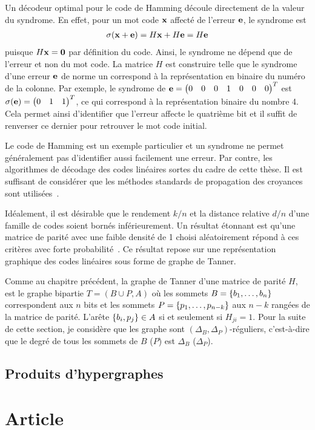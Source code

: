 Un décodeur optimal pour le code de Hamming découle directement de la valeur du syndrome.
En effet, pour un mot code $\vb x$ affecté de l'erreur $\vb e$,
le syndrome est 
\begin{align}
	\sigma(\vb x + \vb e) = H\vb x + H\vb e = H\vb e
\end{align}
puisque $H \vb x = \vb 0$ par définition du code.
Ainsi, le syndrome ne dépend que de l'erreur et non du mot code.
La matrice $H$ est construire telle que le syndrome d'une erreur $\vb e$ de norme un
correspond à la représentation en binaire du numéro de la colonne.
Par exemple,
le syndrome de $\vb e = \begin{pmatrix} 0 & 0 & 0 & 1 & 0 & 0 & 0 \end{pmatrix}^T$
est $\sigma(\vb e) = \begin{pmatrix} 0 & 1 & 1 \end{pmatrix}^T$,
ce qui correspond à la représentation binaire du nombre 4.
Cela permet ainsi d'identifier que l'erreur affecte le quatrième bit et 
il suffit de renverser ce dernier pour retrouver le mot code initial.

Le code de Hamming est un exemple particulier et un syndrome ne permet généralement
pas d'identifier aussi facilement une erreur.
Par contre,
les algorithmes de décodage des codes linéaires sortes du cadre de cette thèse.
Il est suffisant de considérer que les méthodes standards de propagation des 
croyances sont utilisées~\cite{richardson_modern_2008}.

Idéalement,
il est désirable que 
le rendement $k/n$ et la distance relative $d/n$ d'une famille de codes
soient bornés inférieurement.
Un résultat étonnant est qu'une matrice de parité avec une  faible densité de 1
choisi aléatoirement répond à ces critères avec forte probabilité~\cite{gallager_low-density_1962}.
Ce résultat repose sur une représentation graphique des codes linéaires sous forme de graphe de Tanner.

Comme au chapitre précédent,
la graphe de Tanner d'une matrice de parité $H$,
est le graphe bipartie $T = (B \cup P, A)$
où les sommets $B = \qty{b_1, \ldots, b_n}$ correspondent aux $n$ bits
et les sommets $P = \qty{p_1, \ldots, p_{n - k}}$ aux $n - k$ rangées de la matrice de parité.
L'arête $\qty{b_i, p_j} \in A$ si et seulement si $H_{ji} = 1$.
Pour la suite de cette section,
je considère que les graphe sont $(\Delta_B, \Delta_P)$-réguliers,
c'est-à-dire que le degré de tous les sommets de $B$ ($P$) est $\Delta_B$ ($\Delta_P$).








\subsection{Produits d'hypergraphes}


\section{Article}



